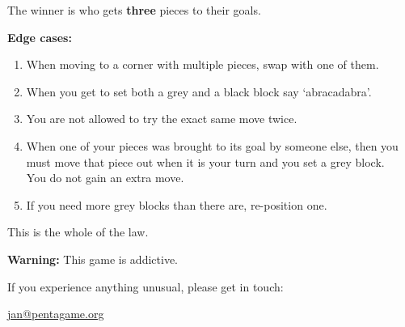     The winner is who gets \textbf{three} pieces to their goals.


\skipper

    \raggedright
    
    \vspace{5ex}
    
    \textbf{Edge cases:}

    \begin{enumerate}
        \item When moving to a corner with multiple pieces, swap with one of them.
        \item When you get to set both a grey and a black block say `abracadabra'.
        \item You are not allowed to try the exact same move twice.        
        \item When one of your pieces was brought to its goal by someone else, then you must move that piece out when it is your turn and you set a grey block.\\ You do not gain an extra move.
        \item If you need more grey blocks than there are, re-position one.
    \end{enumerate}

\hrulefill


\vspace{5ex}

\begin{centering}
    This is the whole of the law.
\end{centering}

\vfill

\begin{framed}
\centering

\textbf{Warning: }This game is addictive.

If you experience anything unusual, please get in touch:

\href{mailto:jan@pentagame.org}{jan@pentagame.org}

\end{framed}
